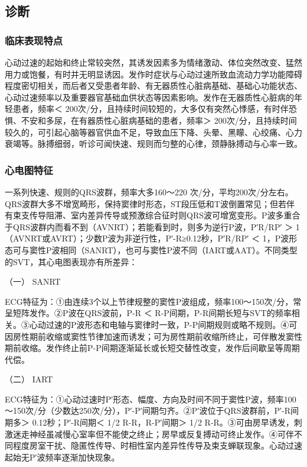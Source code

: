 \subsection{诊断}

\subsubsection{临床表现特点}

心动过速的起始和终止常较突然，其诱发因素多为情绪激动、体位突然改变、猛然用力或饱餐，有时并无明显诱因。发作时症状与心动过速所致血流动力学功能障碍程度密切相关，而后者又受患者年龄、有无器质性心脏病基础、基础心功能状态、心动过速频率以及重要器官基础血供状态等因素影响。发作在无器质性心脏病的年轻患者，频率＜
200次/分，且持续时间较短的，大多仅有突然心悸感，有时伴恐惧、不安和多尿，在有器质性心脏病基础的患者，频率＞
200次/分，且持续时间较久的，可引起心脑等器官供血不足，导致血压下降、头晕、黑矇、心绞痛、心力衰竭等。脉搏细弱，听诊可闻快速、规则而匀整的心律，颈静脉搏动与心率一致。

\subsubsection{心电图特征}

一系列快速、规则的QRS波群，频率大多160～220
次/分，平均200次/分左右。QRS波群大多不增宽畸形，保持窦律时形态，ST段压低和T波倒置常见；但若伴有束支传导阻滞、室内差异传导或预激综合征时则QRS波可增宽变形。P波多重合于QRS波群内而看不到（AVNRT）；若能看到时，则多为逆行P波，P′R/RP′
＞ 1（AVNRT或AVRT）；少数P波为非逆行性，P′-R≥0.12秒，P′R/RP′ ＜
1，P波形态可与窦性P波相同（SANRT），也可与窦性P波不同（IART或AAT）。不同类型的SVT，其心电图表现亦有所差异：

\hypertarget{text00289.htmlux5cux23CHP10-2-2-2-2-1}{}
（一） SANRT

ECG特征为：①由连续3个以上节律规整的窦性P波组成，频率100～150次/分，常呈短阵发作。②P波在QRS波前，P-R
＜
R-P间期，P-R间期长短与SVT的频率相关。③心动过速的P波形态和电轴与窦律时一致，P-P间期规则或略不规则。④可因房性期前收缩或窦性节律加速而诱发；可为房性期前收缩所终止，可伴散发窦性期前收缩。发作终止前P-P间期逐渐延长或长短交替性改变，发作后间歇呈等周期代偿。

\hypertarget{text00289.htmlux5cux23CHP10-2-2-2-2-2}{}
（二） IART

ECG特征为：①心动过速时P′形态、幅度、方向及时间不同于窦性P波，频率100～150次/分（少数达250次/分），P′-P′间期匀齐。②P′波位于QRS波群前，P′-R间期多＞
0.12秒；P′-R间期＜ 1/2 R-R，R-P′间期＞ 1/2
R-R。③可由房早诱发，刺激迷走神经虽减慢心室率但不能使之终止；房早或反复搏动可终止发作。④可伴不同程度房室干扰、隐匿性传导、时相性室内差异性传导及束支蝉联现象。心动过速起始无P′波频率逐渐加快现象。

